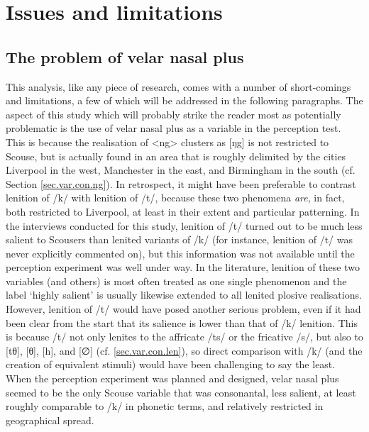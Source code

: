 	\section{Issues and limitations}
		\label{sec.perc_res.disc.issues}

		\subsection{The problem of velar nasal plus}

This analysis, like any piece of research, comes with a number of short-comings and limitations, a few of which will be addressed in the following paragraphs.
The aspect of this study which will probably strike the reader most as potentially problematic is the use of velar nasal plus as a variable in the perception test.
This is because the realisation of <ng> clusters as [ŋg] is not restricted to Scouse, but is actually found in an area that is roughly delimited by the cities Liverpool in the west, Manchester in the east, and Birmingham in the south (cf. Section \ref{sec.var.con.ng}).
In retrospect, it might have been preferable to contrast lenition of /k/ with lenition of /t/, because these two phenomena \emph{are}, in fact, both restricted to Liverpool, at least in their extent and particular patterning.
In the interviews conducted for this study, lenition of /t/ turned out to be much less salient to Scousers than lenited variants of /k/ (for instance, lenition of /t/ was never explicitly commented on), but this information was not available until the perception experiment was well under way.
In the literature, lenition of these two variables (and others) is most often treated as one single phenomenon and the label `highly salient' is usually likewise extended to all lenited plosive realisations.
However, lenition of /t/ would have posed another serious problem, even if it had been clear from the start that its salience is lower than that of /k/ lenition.
This is because /t/ not only lenites to the affricate /ts/ or the fricative /s/, but also to [tθ], [θ], [h], and [∅] (cf. \ref{sec.var.con.len}), so direct comparison with /k/ (and the creation of equivalent stimuli) would have been challenging to say the least.
When the perception experiment was planned and designed, velar nasal plus seemed to be the only Scouse variable that was consonantal, less salient, at least roughly comparable to /k/ in phonetic terms, and relatively restricted in geographical spread.

